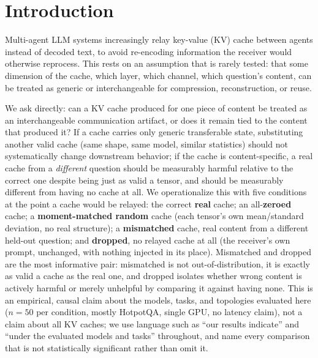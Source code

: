 \documentclass[11pt]{article}
\begin{document}
\begin{abstract}
both sizes) -- the opposite trajectory from the chain's own null, which
we read as further evidence for, not just compatible with, the
chain-versus-fan-in distinction below. We adopt
the zeroed/random/mismatched causal-audit methodology
from Cheng et al.\ (2026); our extension is a dropped control, a static
fan-in topology, and a tool-using delegation loop, evaluated under
multi-hop QA and under compression. Compressed relays (8-bit
quantization, a KIVI-inspired 4-bit fix) retain the same
real-versus-mismatched gap as uncompressed relay, so compression does
not turn the cache into interchangeable generic state. We report exact
McNemar tests and bootstrap confidence intervals throughout, with
Holm-adjusted $p$-values for the confirmatory family of comparisons,
and name every comparison that remains underpowered rather than
confirmed.
\end{abstract}

\section{Introduction}

Multi-agent LLM systems increasingly relay key-value (KV) cache between
agents instead of decoded text, to avoid re-encoding information the
receiver would otherwise reprocess. This rests on an assumption that is
rarely tested: that some dimension of the cache, which layer, which
channel, which question's content, can be treated as generic or
interchangeable for compression, reconstruction, or reuse.

We ask directly: can a KV cache produced for one piece of content be
treated as an interchangeable communication artifact, or does it
remain tied to the content that produced it? If a cache carries only
generic transferable state, substituting another valid cache (same
shape, same model, similar statistics) should not systematically change
downstream behavior; if the cache is content-specific, a real cache
from a \emph{different} question should be measurably harmful relative
to the correct one despite being just as valid a tensor, and should be
measurably different from having no cache at all. We operationalize
this with five conditions at the point a cache would be relayed: the
correct \textbf{real} cache; an all-\textbf{zeroed} cache; a
\textbf{moment-matched random} cache (each tensor's own mean/standard
deviation, no real structure); a \textbf{mismatched} cache, real content
from a different held-out question; and \textbf{dropped}, no relayed
cache at all (the receiver's own prompt, unchanged, with nothing
injected in its place). Mismatched and dropped are the most
informative pair: mismatched is not out-of-distribution, it is exactly
as valid a cache as the real one, and dropped isolates whether wrong
content is actively harmful or merely unhelpful by comparing it against
having none. This is an empirical, causal claim about the models,
tasks, and topologies evaluated here ($n=50$ per condition, mostly
HotpotQA, single GPU, no latency claim), not a claim about all KV
caches; we use language such as ``our results indicate'' and ``under
the evaluated models and tasks'' throughout, and name every comparison
that is not statistically significant rather than omit it.
\end{document}
